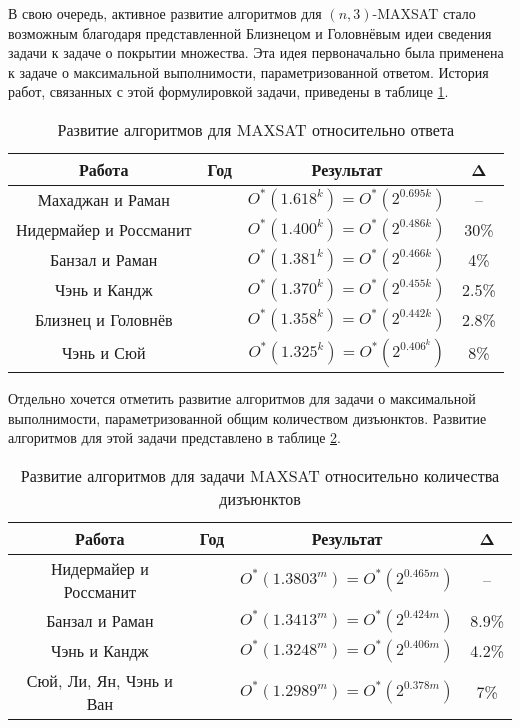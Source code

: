 В свою очередь, активное развитие алгоритмов для $(n,3)$-MAXSAT стало возможным благодаря представленной Близнецом и Головнёвым \cite{bliznets12} идеи сведения задачи к задаче о покрытии множества. Эта идея первоначально была применена к задаче о максимальной выполнимости, параметризованной ответом. История работ, связанных с этой формулировкой задачи, приведены в таблице \ref{table:maxsat-answer-research}.

\begin{table}[ht]
 \caption{Развитие алгоритмов для MAXSAT относительно ответа}
 \centering
 \begin{tabular}{|c|c|c|c|}
  \hline
  \textbf{Работа} & \textbf{Год} & \textbf{Результат} & \textbf{Δ} \\
  \hline
  Махаджан и Раман \cite{mahajan1999parameterizing} & \citeyear{mahajan1999parameterizing} & $O^*(1.618^k) = O^*(2^{0.695k})$ & -- \\
  Нидермайер и Россманит \cite{niedermeier1999new} & \citeyear{niedermeier1999new} & $O^*(1.400^k) = O^*(2^{0.486k})$ & 30\% \\
  Банзал и Раман \cite{bansal99} & \citeyear{bansal99} & $O^*(1.381^k) = O^*(2^{0.466k})$ & 4\% \\
  Чэнь и Кандж \cite{chen2004improved} & \citeyear{chen2004improved} & $O^*(1.370^k) = O^*(2^{0.455k})$ & 2.5\% \\
  Близнец и Головнёв \cite{bliznets12} & \citeyear{bliznets12} & $O^*(1.358^k) = O^*(2^{0.442k})$ & 2.8\% \\
  Чэнь и Сюй \cite{chen15} & \citeyear{chen15} & $O^*(1.325^k) = O^*(2^{0.406^k})$ & 8\% \\
  \hline
 \end{tabular}
 \label{table:maxsat-answer-research}
\end{table}

Отдельно хочется отметить развитие алгоритмов для задачи о максимальной выполнимости, параметризованной общим количеством дизъюнктов. Развитие алгоритмов для этой задачи представлено в таблице \ref{table:maxsat-clauses-research}.

\begin{table}[ht]
 \caption{Развитие алгоритмов для задачи MAXSAT относительно количества дизъюнктов}
 \centering
 \begin{tabular}{|c|c|c|c|}
  \hline
  \textbf{Работа} & \textbf{Год} & \textbf{Результат} & \textbf{Δ} \\
  \hline
  Нидермайер и Россманит \cite{niedermeier1999new} & \citeyear{niedermeier1999new} & $O^*(1.3803^m) = O^*(2^{0.465m})$ & -- \\
  Банзал и Раман \cite{bansal99} & \citeyear{bansal99} & $O^*(1.3413^m) = O^*(2^{0.424m})$ & 8.9\% \\
  Чэнь и Кандж \cite{chen2004improved} & \citeyear{chen2004improved} & $O^*(1.3248^m) = O^*(2^{0.406m})$ & 4.2\% \\
  Сюй, Ли, Ян, Чэнь и Ван \cite{xu19} & \citeyear{xu19} & $O^*(1.2989^m) = O^*(2^{0.378m})$ & 7\% \\
  \hline
 \end{tabular}
 \label{table:maxsat-clauses-research}
\end{table}

